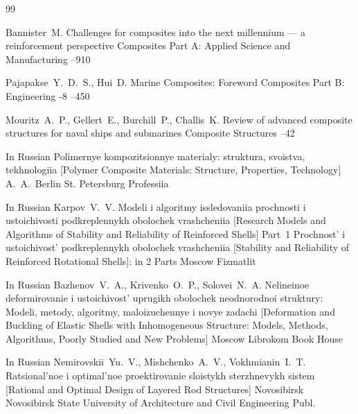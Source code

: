 \begin{thebibliography}{99}


\by Bannister~M.
\paper Challenges for composites into the next millennium — a reinforcement perspective
\jour  Composites Part A: Applied Science and Manufacturing 
--910

\by Pajapakse~Y.~D.~S., Hui~D.
\paper Marine Composites: Foreword
\jour Composites Part B: Engineering
-8 
--450

\by Mouritz~A.~P., Gellert~E., Burchill~P., Challis~K.
\paper Review of advanced composite structures for naval ships and submarines
\jour  Composite Structures
--42

\lang In Russian
\book Polimernye kompozitsionnye materialy: struktura, svoistva, tekhnologiia \rm [Polymer Composite Materials: Structure, Properties, Technology]
\ed A.~A.~Berlin
\publaddr St. Petersburg
\publ Professiia


\lang In Russian
\by Karpov~V.~V.
\book Modeli i algoritmy issledovaniia prochnosti i ustoichivosti podkreplennykh obolochek vrashcheniia \rm 
[Research Models and Algorithms of Stability and Reliability of Reinforced Shells]  Part~1
\serial Prochnost' i ustoichivost' podkreplennykh obolochek vrashcheniia \rm [Stability and Reliability of Reinforced Rotational Shells]: in 2 Parts
\publaddr Moscow
\publ Fizmatlit




\lang In Russian
\by Bazhenov~V.~A., Krivenko~O.~P., Solovei~N.~A.
\book Nelineinoe deformirovanie i ustoichivost' uprugikh obolochek neodnorodnoi struktury: Modeli, metody, algoritmy, maloizuchennye i novye zadachi \rm [Deformation and Buckling of Elastic Shells with Inhomogeneous Structure: Models, Methods, Algorithms, Poorly Studied and New Problems]
\publaddr Moscow
\publ Librokom Book House

\lang In Russian
\by Nemirovskii~Yu.~V., Mishchenko~A.~V., Vokhmianin~I.~T.
\book Ratsional'noe i optimal'noe proektirovanie sloistykh sterzhnevykh sistem \rm  [Rational and Optimal Design of Layered Rod Structures]
\publaddr Novosibirsk
\publ Novosibirsk State University of Architecture and Civil Engineering Publ.



\end{thebibliography}
